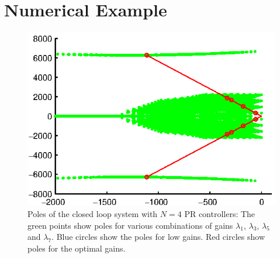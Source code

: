 \documentclass[conference,10pt]{IEEEtran}
\begin{document}
\section{Numerical Example}


\begin{figure}[!h]
\centering

\includegraphics{fig/root_locus}
\caption{Poles of the closed loop system with $N=4$ PR controllers: The green points show poles for various combinations of gains $\lambda_1$, $\lambda_3$, $\lambda_5$ and $\lambda_7$. Blue circles show the poles for low gains. Red circles show poles for the optimal gains. }
\label{fig:PolesOptimalExample}
\end{figure}



\end{document}

